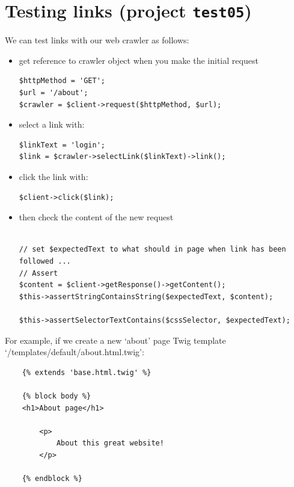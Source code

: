 \documentclass[a4paperpaper,openright]{book}
\begin{document}
\hypertarget{testing-links-project-test05}{%
\section{\texorpdfstring{Testing links (project
\texttt{test05})}{Testing links (project test05)}}\label{testing-links-project-test05}}

We can test links with our web crawler as follows:

\begin{itemize}
\item
  get reference to crawler object when you make the initial request

\begin{verbatim}
$httpMethod = 'GET';
$url = '/about';
$crawler = $client->request($httpMethod, $url);
\end{verbatim}
\item
  select a link with:

\begin{verbatim}
$linkText = 'login';
$link = $crawler->selectLink($linkText)->link();
\end{verbatim}
\item
  click the link with:

\begin{verbatim}
$client->click($link);
\end{verbatim}
\item
  then check the content of the new request

\begin{verbatim}

// set $expectedText to what should in page when link has been followed ...
// Assert
$content = $client->getResponse()->getContent();
$this->assertStringContainsString($expectedText, $content);

$this->assertSelectorTextContains($cssSelector, $expectedText);
\end{verbatim}
\end{itemize}

For example, if we create a new `about' page Twig template
`/templates/default/about.html.twig':

\begin{verbatim}
    {% extends 'base.html.twig' %}

    {% block body %}
    <h1>About page</h1>

        <p>
            About this great website!
        </p>

    {% endblock %}
\end{verbatim}
\end{document}
